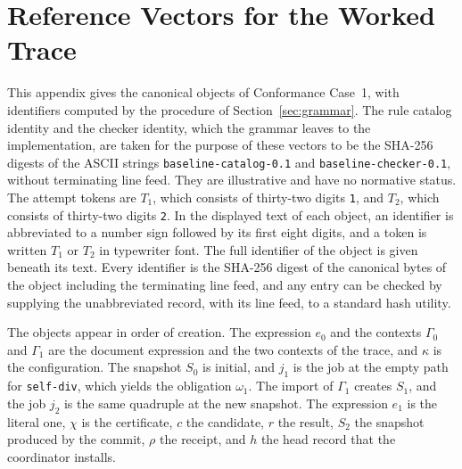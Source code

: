 \documentclass[11pt,a4paper]{article}
\theoremstyle{plain}
\theoremstyle{definition}
\theoremstyle{remark}
\theoremstyle{definition}
\newcommand{\code}[1]{\texttt{#1}}
\begin{document}
\section{Reference Vectors for the Worked Trace}
\label{app:vectors}

This appendix gives the canonical objects of Conformance Case~1, with identifiers computed by the procedure of Section~\ref{sec:grammar}. The rule catalog identity and the checker identity, which the grammar leaves to the implementation, are taken for the purpose of these vectors to be the SHA-256 digests of the ASCII strings \code{baseline-catalog-0.1} and \code{baseline-checker-0.1}, without terminating line feed. They are illustrative and have no normative status. The attempt tokens are $T_1$, which consists of thirty-two digits \code{1}, and $T_2$, which consists of thirty-two digits \code{2}. In the displayed text of each object, an identifier is abbreviated to a number sign followed by its first eight digits, and a token is written $T_1$ or $T_2$ in typewriter font. The full identifier of the object is given beneath its text. Every identifier is the SHA-256 digest of the canonical bytes of the object including the terminating line feed, and any entry can be checked by supplying the unabbreviated record, with its line feed, to a standard hash utility.

The objects appear in order of creation. The expression $e_0$ and the contexts $\Gamma_0$ and $\Gamma_1$ are the document expression and the two contexts of the trace, and $\kappa$ is the configuration. The snapshot $S_0$ is initial, and $j_1$ is the job at the empty path for \code{self-div}, which yields the obligation $\omega_1$. The import of $\Gamma_1$ creates $S_1$, and the job $j_2$ is the same quadruple at the new snapshot. The expression $e_1$ is the literal one, $\chi$ is the certificate, $c$ the candidate, $r$ the result, $S_2$ the snapshot produced by the commit, $\rho$ the receipt, and $h$ the head record that the coordinator installs.

\newcommand{\vecentry}[3]{\par\medskip\noindent\textbf{#1}\quad{\scriptsize #2}\par\noindent\hspace*{2em}{\scriptsize #3}\par}
\end{document}
